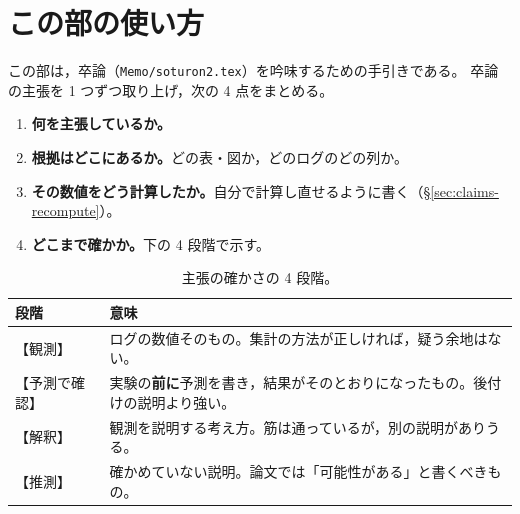 \documentclass[a4j, dvipdfmx]{jsarticle}  %
\begin{document}
\section{この部の使い方}
\label{sec:claims-howto}

この部は，卒論（\texttt{Memo/soturon2.tex}）を吟味するための手引きである。
卒論の主張を 1 つずつ取り上げ，次の 4 点をまとめる。
\begin{enumerate}
  \item \textbf{何を主張しているか。}
  \item \textbf{根拠はどこにあるか。}どの表・図か，どのログのどの列か。
  \item \textbf{その数値をどう計算したか。}自分で計算し直せるように書く（\S\ref{sec:claims-recompute}）。
  \item \textbf{どこまで確かか。}下の 4 段階で示す。
\end{enumerate}

\begin{table}[H]
\centering
\caption{主張の確かさの 4 段階。}
\label{tab:certainty}
\begin{tabular}{@{}P{3.4cm} P{11.9cm}@{}}
\toprule
段階 & 意味 \\
\midrule
【観測】 & ログの数値そのもの。集計の方法が正しければ，疑う余地はない。 \\
【予測で確認】 & 実験の\textbf{前に}予測を書き，結果がそのとおりになったもの。後付けの説明より強い。 \\
【解釈】 & 観測を説明する考え方。筋は通っているが，別の説明がありうる。 \\
【推測】 & 確かめていない説明。論文では「可能性がある」と書くべきもの。 \\
\bottomrule
\end{tabular}
\end{table}
\end{document}
